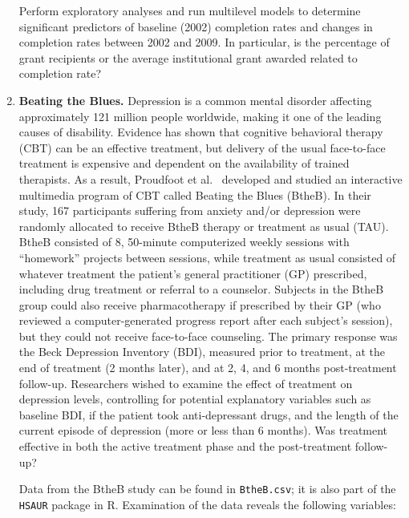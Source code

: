 \documentclass[
]{krantz}
\begin{document}
\begin{enumerate}
  Perform exploratory analyses and run multilevel models to determine significant predictors of baseline (2002) completion rates and changes in completion rates between 2002 and 2009. In particular, is the percentage of grant recipients or the average institutional grant awarded related to completion rate?
\item
  \textbf{Beating the Blues.} Depression is a common mental disorder affecting approximately 121 million people worldwide, making it one of the leading causes of disability. Evidence has shown that cognitive behavioral therapy (CBT) can be an effective treatment, but delivery of the usual face-to-face treatment is expensive and dependent on the availability of trained therapists. As a result, Proudfoot et al.~\citeyearpar{Proudfoot2003} developed and studied an interactive multimedia program of CBT called Beating the Blues (BtheB). In their study, 167 participants suffering from anxiety and/or depression were randomly allocated to receive BtheB therapy or treatment as usual (TAU). BtheB consisted of 8, 50-minute computerized weekly sessions with ``homework'' projects between sessions, while treatment as usual consisted of whatever treatment the patient's general practitioner (GP) prescribed, including drug treatment or referral to a counselor. Subjects in the BtheB group could also receive pharmacotherapy if prescribed by their GP (who reviewed a computer-generated progress report after each subject's session), but they could not receive face-to-face counseling. The primary response was the Beck Depression Inventory (BDI), measured prior to treatment, at the end of treatment (2 months later), and at 2, 4, and 6 months post-treatment follow-up. Researchers wished to examine the effect of treatment on depression levels, controlling for potential explanatory variables such as baseline BDI, if the patient took anti-depressant drugs, and the length of the current episode of depression (more or less than 6 months). Was treatment effective in both the active treatment phase and the post-treatment follow-up?

  Data from the BtheB study can be found in \texttt{BtheB.csv}; it is also part of the \texttt{HSAUR} package \citep{Everitt2006} in R. Examination of the data reveals the following variables:


\end{enumerate}
\end{document}

